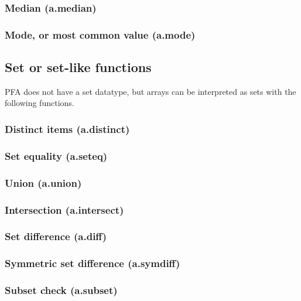 \documentclass{article}
\theoremstyle{definition}
\begin{document}
\subsubsection{Median (a.median)}

\subsubsection{Mode, or most common value (a.mode)}

\subsection{Set or set-like functions}

PFA does not have a set datatype, but arrays can be interpreted as sets with the following functions.

\subsubsection{Distinct items (a.distinct)}

\subsubsection{Set equality (a.seteq)}

\subsubsection{Union (a.union)}

\subsubsection{Intersection (a.intersect)}

\subsubsection{Set difference (a.diff)}

\subsubsection{Symmetric set difference (a.symdiff)}

\subsubsection{Subset check (a.subset)}
\end{document}
